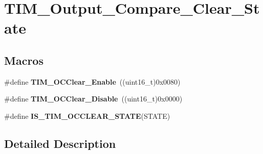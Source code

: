 \hypertarget{group___t_i_m___output___compare___clear___state}{\section{T\-I\-M\-\_\-\-Output\-\_\-\-Compare\-\_\-\-Clear\-\_\-\-State}
\label{group___t_i_m___output___compare___clear___state}
}
\subsection*{Macros}
\begin{DoxyCompactItemize}
\item 
\hypertarget{group___t_i_m___output___compare___clear___state_ga1b7bce48b3e1478aad98c95fbbe7a6e0}{\#define {\bfseries T\-I\-M\-\_\-\-O\-C\-Clear\-\_\-\-Enable}~((uint16\-\_\-t)0x0080)}\label{group___t_i_m___output___compare___clear___state_ga1b7bce48b3e1478aad98c95fbbe7a6e0}

\item 
\hypertarget{group___t_i_m___output___compare___clear___state_gadb09946cb5dded7520baf4b19173204d}{\#define {\bfseries T\-I\-M\-\_\-\-O\-C\-Clear\-\_\-\-Disable}~((uint16\-\_\-t)0x0000)}\label{group___t_i_m___output___compare___clear___state_gadb09946cb5dded7520baf4b19173204d}

\item 
\#define {\bfseries I\-S\-\_\-\-T\-I\-M\-\_\-\-O\-C\-C\-L\-E\-A\-R\-\_\-\-S\-T\-A\-T\-E}(S\-T\-A\-T\-E)
\end{DoxyCompactItemize}


\subsection{Detailed Description}


